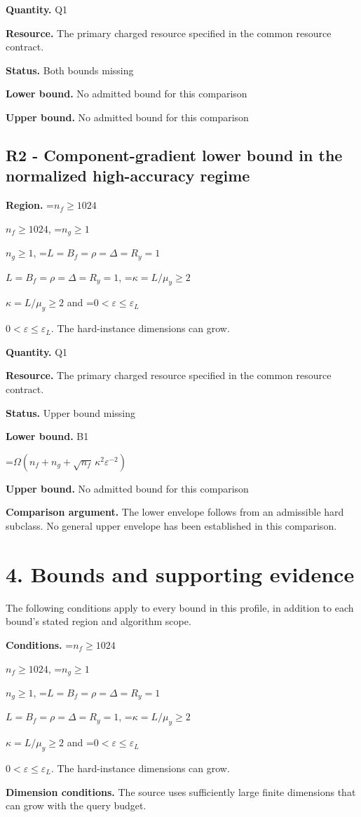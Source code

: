 \documentclass[10pt,a4paper]{article}
\newcommand{\AtlasMath}[1]{\par\begingroup\centering\setbox0=\hbox{$\displaystyle #1$}\ifdim\wd0>1.4\linewidth\typeout{ATLAS WIDE FORMULA: \the\wd0}\fi\ifdim\wd0>\linewidth\resizebox{\linewidth}{!}{\box0}\else\box0\fi\par\endgroup}
\newcommand{\AtlasInlineMath}[1]{\begingroup\setbox0=\hbox{$#1$}\ifdim\wd0>.4\linewidth\endgroup\AtlasMath{#1}\else\endgroup$#1$\fi}
\begin{document}
\textbf{Quantity.} Q1

\textbf{Resource.} The primary charged resource specified in the common resource contract.

\textbf{Status.} Both bounds missing

\textbf{Lower bound.} No admitted bound for this comparison

\textbf{Upper bound.} No admitted bound for this comparison

\subsection{R2 - Component-gradient lower bound in the normalized high-accuracy regime}
\textbf{Region.} \AtlasInlineMath{n_f\ge1024}, \AtlasInlineMath{n_g\ge1}, \AtlasInlineMath{L=B_f=\rho=\Delta=R_y=1}, \AtlasInlineMath{\kappa=L/\mu_y\ge2} and \AtlasInlineMath{0<\varepsilon\le\varepsilon_L}. The hard-instance dimensions can grow.

\textbf{Quantity.} Q1

\textbf{Resource.} The primary charged resource specified in the common resource contract.

\textbf{Status.} Upper bound missing

\textbf{Lower bound.} B1

\AtlasMath{\Omega\!\left(n_f+n_g+\sqrt{n_f}\,\kappa^2\varepsilon^{-2}\right)}
\textbf{Upper bound.} No admitted bound for this comparison

\textbf{Comparison argument.} The lower envelope follows from an admissible hard subclass. No general upper envelope has been established in this comparison.

\section{4. Bounds and supporting evidence}
The following conditions apply to every bound in this profile, in addition to each bound's stated region and algorithm scope.

\textbf{Conditions.} \AtlasInlineMath{n_f\ge1024}, \AtlasInlineMath{n_g\ge1}, \AtlasInlineMath{L=B_f=\rho=\Delta=R_y=1}, \AtlasInlineMath{\kappa=L/\mu_y\ge2} and \AtlasInlineMath{0<\varepsilon\le\varepsilon_L}. The hard-instance dimensions can grow.

\textbf{Dimension conditions.} The source uses sufficiently large finite dimensions that can grow with the query budget.
\end{document}
